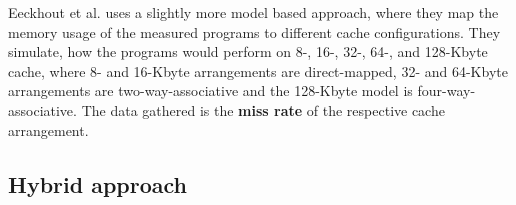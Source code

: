 \documentclass[../bachelor_paper.tex]{subfiles}
\begin{document}
Eeckhout et al. \cite{eeckhoutDesigningComputerArchitecture2003} uses a slightly more model based approach, where they map the memory usage of the measured programs to different cache configurations. They simulate, how the programs would perform on 8-, 16-, 32-, 64-, and 128-Kbyte cache, where 8- and 16-Kbyte arrangements are direct-mapped, 32- and 64-Kbyte arrangements are two-way-associative and the 128-Kbyte model is four-way-associative. The data gathered is the \textbf{miss rate} of the respective cache arrangement.



\subsection{Hybrid approach}
	\label{ch:theory/similarity/hybrid}



\isstandalone



\fi
\end{document}
